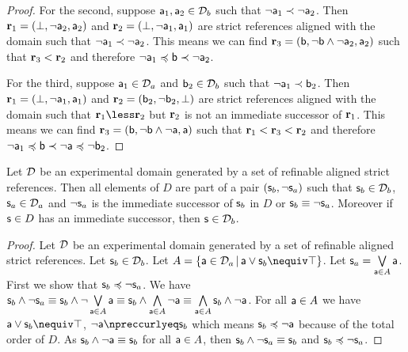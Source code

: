 \documentclass[11pt,letterpaper,fleqn]{memoir} %
\begin{document}
\begin{mathSection}
\begin{proof}
	For the second, suppose $\stmt[a]_1, \stmt[a]_2 \in \edomain_b$ such that $\NOT \stmt[a]_1 \snarrower \NOT \stmt[a]_2$. Then $\refStmt_1 = ( \contradiction, \NOT \stmt[a]_2, \stmt[a]_2 )$ and  $\refStmt_2 = ( \contradiction, \NOT \stmt[a]_1, \stmt[a]_1)$ are strict references aligned with the domain such that $\NOT \stmt[a]_1 \snarrower \NOT \stmt[a]_2$. This means we can find $\refStmt_3 = ( \stmt[b], \NOT \stmt[b] \AND \NOT \stmt[a]_2, \stmt[a]_2 )$ such that $\refStmt_3 < \refStmt_2$ and therefore $\NOT \stmt[a]_1 \narrower \stmt[b] \snarrower \NOT \stmt[a]_2$.
	
	For the third, suppose $\stmt[a]_1 \in \edomain_a$ and $\stmt[b]_2\in \edomain_b$ such that $\NOT \stmt[a]_1 \snarrower \stmt[b]_2$. Then $\refStmt_1 = ( \contradiction, \NOT \stmt[a]_1, \stmt[a]_1 )$ and  $\refStmt_2 = ( \stmt[b]_2, \NOT \stmt[b]_2, \contradiction)$ are strict references aligned with the domain such that $\refStmt_1 \less \refStmt_2$ but $\refStmt_2$ is not an immediate successor of $\refStmt_1$. This means we can find $\refStmt_3 = ( \stmt[b], \NOT \stmt[b] \AND \NOT \stmt[a], \stmt[a] )$ such that $\refStmt_1 < \refStmt_3 < \refStmt_2$ and therefore $\NOT \stmt[a]_1 \narrower \stmt[b] \snarrower \NOT \stmt[a] \narrower \NOT \stmt[b]_2$.
\end{proof}

\begin{prop}\label{3_prop_refinable_is_pair_ordering}
	Let $\edomain$ be an experimental domain generated by a set of refinable aligned strict references. Then all elements of $D$ are part of a pair $(\stmt_b, \NOT \stmt_a)$ such that $\stmt_b \in \edomain_b$, $\stmt_a \in \edomain_a$ and $\NOT \stmt_a$ is the immediate successor of $\stmt_b$ in $D$ or $\stmt_b \equiv \NOT \stmt_a$. Moreover if $\stmt \in D$ has an immediate successor, then $\stmt \in \edomain_b$.
\end{prop}
\begin{proof}
	Let $\edomain$ be an experimental domain generated by a set of refinable aligned strict references. Let $\stmt_b \in \edomain_b$. Let $A=\{\stmt[a] \in \edomain_a \, | \, \stmt[a] \OR \stmt_b \nequiv \tautology \}$. Let $\stmt_a=\bigOR\limits_{\stmt[a] \in A} \stmt[a]$. First we show that $\stmt_b \narrower \NOT \stmt_a$. We have $\stmt_b \AND \NOT \stmt_a \equiv \stmt_b \AND \NOT \bigOR\limits_{\stmt[a] \in A} \stmt[a] \equiv \stmt_b \AND \bigAND\limits_{\stmt[a] \in A} \NOT \stmt[a] \equiv \bigAND\limits_{\stmt[a] \in A} \stmt_b \AND \NOT \stmt[a]$. For all $\stmt[a] \in A$ we have $\stmt[a] \OR \stmt_b \nequiv \tautology$, $\NOT \stmt[a] \nnarrower \stmt_b$ which means $\stmt_b \narrower \NOT \stmt[a]$ because of the total order of $D$. As $\stmt_b \AND \NOT \stmt[a] \equiv \stmt_b$ for all $\stmt[a] \in A$, then $\stmt_b \AND \NOT \stmt_a \equiv \stmt_b$ and $\stmt_b \narrower \NOT \stmt_a$.
	

\end{proof}
\end{mathSection}
\end{document}
